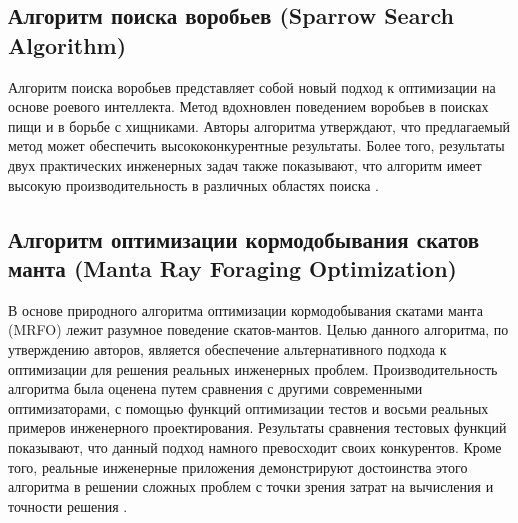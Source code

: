 \subsection{Алгоритм поиска воробьев (Sparrow Search Algorithm)}\label{SSA}

Алгоритм поиска воробьев представляет собой новый подход к оптимизации на основе роевого интеллекта.
Метод вдохновлен поведением воробьев в поисках пищи и в борьбе с хищниками. Авторы алгоритма
утверждают, что предлагаемый метод может обеспечить высококонкурентные результаты. Более того, результаты
двух практических инженерных задач также показывают, что алгоритм имеет высокую производительность в различных
областях поиска \cite{SSA}.

\subsection{Алгоритм оптимизации кормодобывания скатов манта (Manta Ray Foraging Optimization)}\label{MRFO}

В основе природного алгоритма оптимизации кормодобывания скатами манта (MRFO) лежит разумное поведение
скатов-мантов. Целью данного алгоритма, по утверждению авторов, является обеспечение альтернативного подхода
к оптимизации для решения реальных инженерных проблем. Производительность алгоритма была оценена
путем сравнения с другими современными оптимизаторами, с помощью функций оптимизации тестов и восьми
реальных примеров инженерного проектирования. Результаты сравнения тестовых функций показывают, что данный подход
намного превосходит своих конкурентов. Кроме того, реальные инженерные приложения демонстрируют достоинства
этого алгоритма в решении сложных проблем с точки зрения затрат на вычисления и точности решения \cite{MRFO}.

